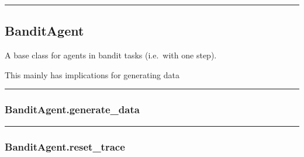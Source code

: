\begin{center}\rule{0.5\linewidth}{\linethickness}\end{center}

\hypertarget{banditagent}{%
\subsection{BanditAgent}\label{banditagent}}

\begin{Shaded}
\begin{Highlighting}[]
\end{Highlighting}
\end{Shaded}

A base class for agents in bandit tasks (i.e.~with one step).

This mainly has implications for generating data

\begin{center}\rule{0.5\linewidth}{\linethickness}\end{center}

\hypertarget{banditagent.generate_data}{%
\subsubsection{BanditAgent.generate\_data}\label{banditagent.generate_data}}

\begin{Shaded}
\begin{Highlighting}[]
\end{Highlighting}
\end{Shaded}

\begin{center}\rule{0.5\linewidth}{\linethickness}\end{center}

\hypertarget{banditagent.reset_trace}{%
\subsubsection{BanditAgent.reset\_trace}\label{banditagent.reset_trace}}

\begin{Shaded}
\begin{Highlighting}[]
\OperatorTok{=}\NormalTok{)}
\end{Highlighting}
\end{Shaded}

